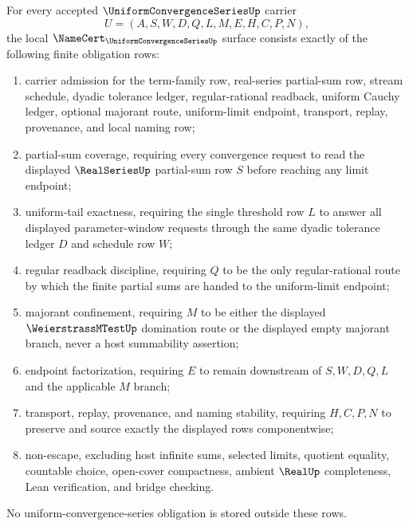 \begin{theorem}
\label{thm:uniform-convergence-series-namecert-obligations}
For every accepted $\UniformConvergenceSeriesUp$ carrier
$$
U=(A,S,W,D,Q,L,M,E,H,C,P,N),
$$
the local $\NameCert_{\UniformConvergenceSeriesUp}$ surface consists exactly of the following finite obligation rows:
\begin{enumerate}
\item carrier admission for the term-family row, real-series partial-sum row, stream schedule, dyadic tolerance ledger, regular-rational readback, uniform Cauchy ledger, optional majorant route, uniform-limit endpoint, transport, replay, provenance, and local naming row;
\item partial-sum coverage, requiring every convergence request to read the displayed $\RealSeriesUp$ partial-sum row $S$ before reaching any limit endpoint;
\item uniform-tail exactness, requiring the single threshold row $L$ to answer all displayed parameter-window requests through the same dyadic tolerance ledger $D$ and schedule row $W$;
\item regular readback discipline, requiring $Q$ to be the only regular-rational route by which the finite partial sums are handed to the uniform-limit endpoint;
\item majorant confinement, requiring $M$ to be either the displayed $\WeierstrassMTestUp$ domination route or the displayed empty majorant branch, never a host summability assertion;
\item endpoint factorization, requiring $E$ to remain downstream of $S,W,D,Q,L$ and the applicable $M$ branch;
\item transport, replay, provenance, and naming stability, requiring $H,C,P,N$ to preserve and source exactly the displayed rows componentwise;
\item non-escape, excluding host infinite sums, selected limits, quotient equality, countable choice, open-cover compactness, ambient $\RealUp$ completeness, Lean verification, and bridge checking.
\end{enumerate}
No uniform-convergence-series obligation is stored outside these rows.
\end{theorem}

